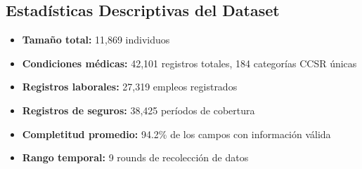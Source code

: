 \documentclass[12pt,a4paper]{article}
\begin{document}
\subsection{Estadísticas Descriptivas del Dataset}
\begin{itemize}
    \item \textbf{Tamaño total:} 11,869 individuos
    \item \textbf{Condiciones médicas:} 42,101 registros totales, 184 categorías CCSR únicas
    \item \textbf{Registros laborales:} 27,319 empleos registrados
    \item \textbf{Registros de seguros:} 38,425 períodos de cobertura
    \item \textbf{Completitud promedio:} 94.2\% de los campos con información válida
    \item \textbf{Rango temporal:} 9 rounds de recolección de datos
\end{itemize}
\end{document}
